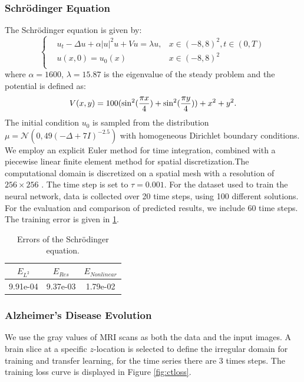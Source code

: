 \documentclass[preprint,12pt]{elsarticle}
\theoremstyle{plain}
\numberwithin{figure}{section}
\numberwithin{table}{section}
\begin{document}
\subsubsection{Schr\"odinger Equation}
The Schr\"odinger equation is given by:
\begin{equation}
	\left\{\begin{aligned}
		&u_t	-\Delta u +\alpha |u|^2u+Vu=\lambda u, &x\in (-8,8)^2,t\in(0,T)\\
		& u(x,0)=u_0(x) &x\in (-8,8)^2\\
	\end{aligned}
	\right.
\end{equation}
where $\alpha=1600$, $\lambda=15.87$ is the eigenvalue of the steady problem and the potential is defined as:
\begin{equation}
	V(x,y) = 100(\sin^2({\pi x\over 4})+\sin^2({\pi y\over 4}))+x^2+y^2.
\end{equation}
The initial condition  $u_0 $ is sampled from the distribution $\mu=\mathcal{N}(0,49(-\Delta+7I)^{-2.5})$ with homogeneous Dirichlet boundary conditions. We employ an explicit Euler method for time integration, combined with a piecewise linear finite element method for spatial discretization.The computational domain is discretized on a spatial mesh with a resolution of $256\times 256$ . The time step is set to $\tau=0.001$. For the dataset used to train the neural network, data is collected over 20 time steps, using 100 different solutions. For the evaluation and comparison of predicted results, we include 60 time steps. The training error is given in \ref{tab:Sch}.

\begin{table}[!htbp]
	\centering
	\caption{Errors of the Schr\"odinger equation. }
	\begin{tabular}{ccc}
		\hline
		$E_{L^2}$ &  $E_{Res}$  &$E_{Nonlinear}$\\
		\hline
		9.91e-04&9.37e-03& 1.79e-02\\
		\hline
	\end{tabular}
	\label{tab:Sch}
\end{table}


\subsubsection{Alzheimer's Disease Evolution}
We use the gray values of MRI scans as both the data and the input images. A brain slice at a specific $z$-location is selected to define the irregular domain for training and transfer learning, for the time series there are 3 times steps. The training loss curve is displayed in Figure \ref{fig:ctloss}. 
\end{document}
